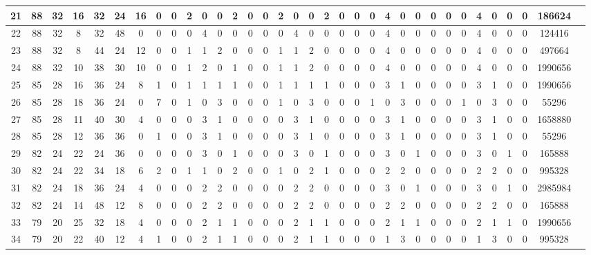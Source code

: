 \begin{frame}
{{\begin{tabular}{|c|c|c|c|c|c|c|c|c|c|c|c|c|c|c|c|c|c|c|c|c|c|c|c|c|c|c|c|c|c|c|c|c|c|}
				\hline
				21 & 88 & 32 & 16 & 32 & 24 & 16 & 0 & 0 & 2 & 0 & 0 & 2 & 0 & 0 & 2 & 0 & 0 & 2 & 0 & 0 & 0 & 4 & 0 & 0 & 0 & 0 & 0 & 4 & 0 & 0 & 0 & 186624\\
				\hline
				22 & 88 & 32 & 8 & 32 & 48 & 0 & 0 & 0 & 0 & 4 & 0 & 0 & 0 & 0 & 0 & 4 & 0 & 0 & 0 & 0 & 0 & 4 & 0 & 0 & 0 & 0 & 0 & 4 & 0 & 0 & 0 & 124416\\
				\hline
				23 & 88 & 32 & 8 & 44 & 24 & 12 & 0 & 0 & 1 & 1 & 2 & 0 & 0 & 0 & 1 & 1 & 2 & 0 & 0 & 0 & 0 & 4 & 0 & 0 & 0 & 0 & 0 & 4 & 0 & 0 & 0 & 497664\\
				\hline
				24 & 88 & 32 & 10 & 38 & 30 & 10 & 0 & 0 & 1 & 2 & 0 & 1 & 0 & 0 & 1 & 1 & 2 & 0 & 0 & 0 & 0 & 4 & 0 & 0 & 0 & 0 & 0 & 4 & 0 & 0 & 0 & 1990656\\
				\hline
				25 & 85 & 28 & 16 & 36 & 24 & 8 & 1 & 0 & 1 & 1 & 1 & 1 & 0 & 0 & 1 & 1 & 1 & 1 & 0 & 0 & 0 & 3 & 1 & 0 & 0 & 0 & 0 & 3 & 1 & 0 & 0 & 1990656\\
				\hline
				26 & 85 & 28 & 18 & 36 & 24 & 0 & 7 & 0 & 1 & 0 & 3 & 0 & 0 & 0 & 1 & 0 & 3 & 0 & 0 & 0 & 1 & 0 & 3 & 0 & 0 & 0 & 1 & 0 & 3 & 0 & 0 & 55296\\
				\hline
				27 & 85 & 28 & 11 & 40 & 30 & 4 & 0 & 0 & 0 & 3 & 1 & 0 & 0 & 0 & 0 & 3 & 1 & 0 & 0 & 0 & 0 & 3 & 1 & 0 & 0 & 0 & 0 & 3 & 1 & 0 & 0 & 1658880\\
				\hline
				28 & 85 & 28 & 12 & 36 & 36 & 0 & 1 & 0 & 0 & 3 & 1 & 0 & 0 & 0 & 0 & 3 & 1 & 0 & 0 & 0 & 0 & 3 & 1 & 0 & 0 & 0 & 0 & 3 & 1 & 0 & 0 & 55296\\
				\hline
				29 & 82 & 24 & 22 & 24 & 36 & 0 & 0 & 0 & 0 & 3 & 0 & 1 & 0 & 0 & 0 & 3 & 0 & 1 & 0 & 0 & 0 & 3 & 0 & 1 & 0 & 0 & 0 & 3 & 0 & 1 & 0 & 165888\\
				\hline
				30 & 82 & 24 & 22 & 34 & 18 & 6 & 2 & 0 & 1 & 1 & 0 & 2 & 0 & 0 & 1 & 0 & 2 & 1 & 0 & 0 & 0 & 2 & 2 & 0 & 0 & 0 & 0 & 2 & 2 & 0 & 0 & 995328\\
				\hline
				31 & 82 & 24 & 18 & 36 & 24 & 4 & 0 & 0 & 0 & 2 & 2 & 0 & 0 & 0 & 0 & 2 & 2 & 0 & 0 & 0 & 0 & 3 & 0 & 1 & 0 & 0 & 0 & 3 & 0 & 1 & 0 & 2985984\\
				\hline
				32 & 82 & 24 & 14 & 48 & 12 & 8 & 0 & 0 & 0 & 2 & 2 & 0 & 0 & 0 & 0 & 2 & 2 & 0 & 0 & 0 & 0 & 2 & 2 & 0 & 0 & 0 & 0 & 2 & 2 & 0 & 0 & 165888\\
				\hline
				33 & 79 & 20 & 25 & 32 & 18 & 4 & 0 & 0 & 0 & 2 & 1 & 1 & 0 & 0 & 0 & 2 & 1 & 1 & 0 & 0 & 0 & 2 & 1 & 1 & 0 & 0 & 0 & 2 & 1 & 1 & 0 & 1990656\\
				\hline
				34 & 79 & 20 & 22 & 40 & 12 & 4 & 1 & 0 & 0 & 2 & 1 & 1 & 0 & 0 & 0 & 2 & 1 & 1 & 0 & 0 & 0 & 1 & 3 & 0 & 0 & 0 & 0 & 1 & 3 & 0 & 0 & 995328\\

\end{tabular}}}
\end{frame}
